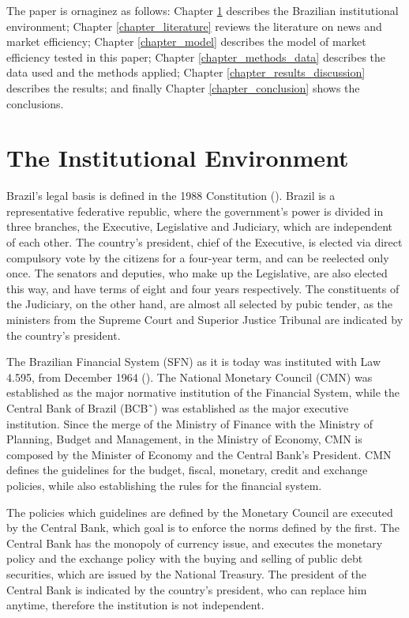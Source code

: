 \documentclass[cic,tc, english]{iiufrgs}
\begin{document}
    The paper is ornaginez as follows: Chapter \ref{chapter_institutional} describes the Brazilian institutional environment; Chapter \ref{chapter_literature} reviews the literature on news and market efficiency; Chapter \ref{chapter_model} describes the model of market efficiency tested in this paper; Chapter \ref{chapter_methods_data} describes the data used and the methods applied; Chapter \ref{chapter_results_discussion} describes the results; and finally Chapter \ref{chapter_conclusion} shows the conclusions.

\chapter{The Institutional Environment} \label{chapter_institutional}

    Brazil's legal basis is defined in the 1988 Constitution (\citet{constituicao}). Brazil is a representative federative republic, where the government's power is divided in three branches, the Executive, Legislative and Judiciary, which are independent of each other. The country's president, chief of the Executive, is elected via direct compulsory vote by the citizens for a four-year term, and can be reelected only once. The senators and deputies, who make up the Legislative, are also elected this way, and have terms of eight and four years respectively. The constituents of the Judiciary, on the other hand, are almost all selected by pubic tender, as the ministers from the Supreme Court and Superior Justice Tribunal are indicated by the country's president.

    The Brazilian Financial System (SFN) as it is today was instituted with Law 4.595, from December 1964 (\citet{lei4595}). The National Monetary Council (CMN) was established as the major normative institution of the Financial System, while the Central Bank of Brazil (BCB˜) was established as the major executive institution. Since the merge of the Ministry of Finance with the Ministry of Planning, Budget and Management, in the Ministry of Economy, CMN is composed by the Minister of Economy and the Central Bank's President. CMN defines the guidelines for the budget, fiscal, monetary, credit and exchange policies, while also establishing the rules for the financial system.

    The policies which guidelines are defined by the Monetary Council are executed by the Central Bank, which goal is to enforce the norms defined by the first. The Central Bank has the monopoly of currency issue, and executes the monetary policy and the exchange policy with the buying and selling of public debt securities, which are issued by the National Treasury. The president of the Central Bank is indicated by the country's president, who can replace him anytime, therefore the institution is not independent.
\end{document}
